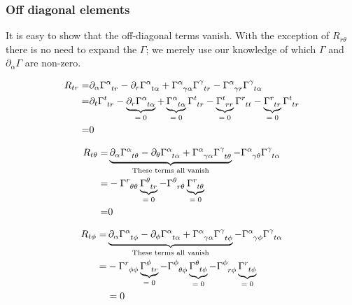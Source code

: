 \documentclass[]{article}
\begin{document}
\subsubsection{Off diagonal elements}
It is easy to show that the off-diagonal terms vanish. With the exception of $R_{r\theta}$ there is no need to expand the $\Gamma$; we merely use our knowledge of which $\Gamma$ and $\partial_\alpha \Gamma$ are non-zero.

\begin{align*}
	R_{tr} =& \partial_\alpha \Gamma\indices{^\alpha_{tr}} - \partial_r \Gamma\indices{^\alpha_{t\alpha}} + \Gamma\indices{^\alpha_{\gamma\alpha}} \Gamma\indices{^\gamma_{tr}} - \Gamma\indices{^\alpha_{\gamma r}} \Gamma\indices{^\gamma_{t\alpha}}\\
	=&\partial_t \Gamma\indices{^t_{tr}} - \underbrace{\partial_r \Gamma\indices{^\alpha_{t\alpha}}}_\text{$=0$} + \underbrace{\Gamma\indices{^\alpha_{t\alpha}}}_\text{$=0$} \Gamma\indices{^t_{tr}} - \underbrace{\Gamma\indices{^t_{r r}}}_\text{$=0$} \Gamma\indices{^r_{tt}} -\underbrace{ \Gamma\indices{^r_{t r}}}_\text{$=0$} \Gamma\indices{^t_{tr}}\\
	=&0
\end{align*}

\begin{align*}
	R_{t\theta} =& \underbrace{\partial_\alpha \Gamma\indices{^\alpha_{t\theta}} - \partial_\theta \Gamma\indices{^\alpha_{t\alpha}} + \Gamma\indices{^\alpha_{\gamma\alpha}} \Gamma\indices{^\gamma_{t\theta}}}_\text{These terms all vanish} - \Gamma\indices{^\alpha_{\gamma\theta}} \Gamma\indices{^\gamma_{t\alpha}}\\
	=&  - \Gamma\indices{^r_{\theta\theta}} \underbrace{\Gamma\indices{^\theta_{tr}}}_\text{$=0$}  - \Gamma\indices{^\theta_{r\theta}} \underbrace{\Gamma\indices{^r_{t\theta}}}_\text{$=0$} \\
	=&0 
\end{align*}

\begin{align*}
	R_{t\phi} =& \underbrace{\partial_\alpha \Gamma\indices{^\alpha_{t\phi}} - \partial_\phi \Gamma\indices{^\alpha_{t\alpha}} + \Gamma\indices{^\alpha_{\gamma\alpha}} \Gamma\indices{^\gamma_{t\phi}} }_\text{These terms all vanish}- \Gamma\indices{^\alpha_{\gamma\phi}} \Gamma\indices{^\gamma_{t\alpha}}\\
	=& - \Gamma\indices{^r_{\phi\phi}} \underbrace{\Gamma\indices{^\phi_{tr}}}_\text{$=0$} - \Gamma\indices{^\phi_{\theta\phi}} \underbrace{\Gamma\indices{^\theta_{t\phi}}}_\text{$=0$}- \Gamma\indices{^\phi_{r\phi}} \underbrace{\Gamma\indices{^r_{t\phi}}}_\text{$=0$}\\
	&=0
\end{align*}
\end{document}
